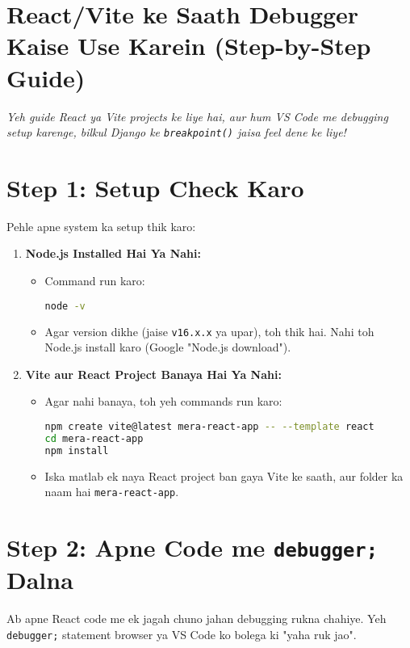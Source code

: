 \documentclass[a4paper,12pt]{article}
\begin{document}
\section{  React/Vite ke Saath Debugger Kaise Use Karein (Step-by-Step Guide)}
\textit{Yeh guide React ya Vite projects ke liye hai, aur hum VS Code me debugging setup karenge, bilkul Django ke \texttt{\color{mygreen}breakpoint()} jaisa feel dene ke liye!}

\section{  Step 1: Setup Check Karo}
Pehle apne system ka setup thik karo:  
\begin{enumerate}
    \item \textbf{\color{myblue}Node.js Installed Hai Ya Nahi:}  
    \begin{itemize}
        \item Command run karo:  
        \begin{lstlisting}[language=Bash]
node -v
        \end{lstlisting}
        \item Agar version dikhe (jaise \texttt{\color{mygreen}v16.x.x} ya upar), toh thik hai. Nahi toh Node.js install karo (Google "Node.js download").
    \end{itemize}

    \item \textbf{\color{myblue}Vite aur React Project Banaya Hai Ya Nahi:}  
    \begin{itemize}
        \item Agar nahi banaya, toh yeh commands run karo:  
        \begin{lstlisting}[language=Bash]
npm create vite@latest mera-react-app -- --template react
cd mera-react-app
npm install
        \end{lstlisting}
        \item Iska matlab ek naya React project ban gaya Vite ke saath, aur folder ka naam hai \texttt{\color{mygreen}mera-react-app}.
    \end{itemize}
\end{enumerate}

\section{  Step 2: Apne Code me \texttt{\color{mygreen}debugger;} Dalna}
Ab apne React code me ek jagah chuno jahan debugging rukna chahiye. Yeh \texttt{\color{mygreen}debugger;} statement browser ya VS Code ko bolega ki "yaha ruk jao".
\end{document}
